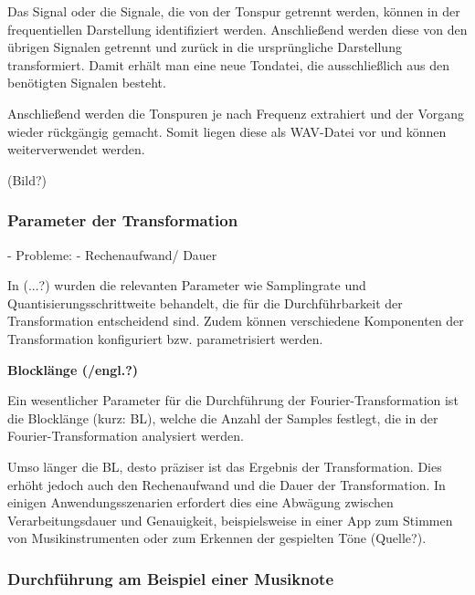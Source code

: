 \par

Das Signal oder die Signale, die von der Tonspur getrennt werden, können in der frequentiellen Darstellung identifiziert werden. Anschließend werden diese von den übrigen Signalen getrennt und zurück in die ursprüngliche Darstellung transformiert. Damit erhält man eine neue Tondatei, die ausschließlich aus den benötigten Signalen besteht.

\par

Anschließend werden die Tonspuren je nach Frequenz extrahiert und der Vorgang wieder rückgängig gemacht. Somit liegen diese als WAV-Datei vor und können weiterverwendet werden.

%
(Bild?)
%

\subsubsection{Parameter der Transformation}

 - Probleme:
    - Rechenaufwand/ Dauer

In (...?) wurden die relevanten Parameter wie Samplingrate und Quantisierungsschrittweite behandelt, die für die Durchführbarkeit der Transformation entscheidend sind. Zudem können verschiedene Komponenten der Transformation konfiguriert bzw. parametrisiert werden.

\par

%
\textbf{Blocklänge (/engl.?)}
%

Ein wesentlicher Parameter für die Durchführung der Fourier-Transformation ist die Blocklänge (kurz: BL), welche die Anzahl der Samples festlegt, die in der Fourier-Transformation analysiert werden.

\par

Umso länger die BL, desto präziser ist das Ergebnis der Transformation. Dies erhöht jedoch auch den Rechenaufwand und die Dauer der Transformation. In einigen Anwendungsszenarien erfordert dies eine Abwägung zwischen Verarbeitungsdauer und Genauigkeit, beispielsweise in einer App zum Stimmen von Musikinstrumenten oder zum Erkennen der gespielten Töne (Quelle?).

\par

\subsubsection{Durchführung am Beispiel einer Musiknote}

